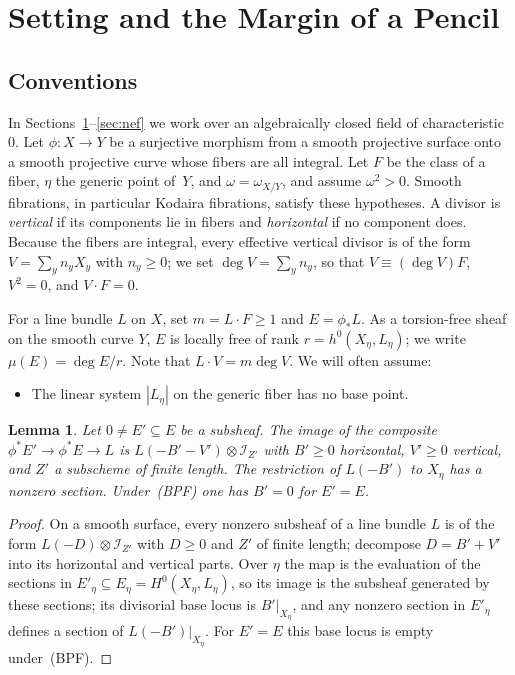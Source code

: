 \documentclass[11pt]{article}
\newtheorem{lemma}[theorem]{Lemma}
\theoremstyle{definition}
\theoremstyle{remark}
\newcommand{\cI}{\mathcal{I}}
\newcommand{\bpf}{\textup{(BPF)}}
\begin{document}
\section{Setting and the Margin of a Pencil}\label{sec:setting}

\subsection{Conventions}
In Sections~\ref{sec:setting}--\ref{sec:nef} we work over an algebraically closed
field of characteristic~$0$. Let $\phi\colon X\to Y$ be a surjective morphism
from a smooth projective surface onto a smooth projective curve whose fibers are
all integral. Let $F$ be the class of a fiber, $\eta$ the generic point of~$Y$,
and $\omega=\omega_{X/Y}$, and assume $\omega^2>0$. Smooth fibrations, in
particular Kodaira fibrations, satisfy these hypotheses. A divisor is
\emph{vertical} if its components lie in fibers and \emph{horizontal} if no
component does. Because the fibers are integral, every effective vertical divisor
is of the form $V=\sum_y n_yX_y$ with $n_y\ge 0$; we set $\deg V=\sum_y n_y$, so
that $V\equiv(\deg V)F$, $V^2=0$, and $V\cdot F=0$.

For a line bundle $L$ on $X$, set $m=L\cdot F\ge 1$ and $E=\phi_*L$. As a
torsion-free sheaf on the smooth curve $Y$, $E$ is locally free of rank
$r=h^0(X_\eta,L_\eta)$; we write $\mu(E)=\deg E/r$. Note that $L\cdot V=m\deg V$.
We will often assume:
\begin{itemize}[leftmargin=3.5em]
\item[\bpf] The linear system $|L_\eta|$ on the generic fiber has no base point.
\end{itemize}

\begin{lemma}\label{lem:image}
Let $0\ne E'\subseteq E$ be a subsheaf. The image of the composite
$\phi^*E'\to\phi^*E\to L$ is $L(-B'-V')\otimes\cI_{Z'}$ with $B'\ge 0$
horizontal, $V'\ge 0$ vertical, and $Z'$ a subscheme of finite length. The
restriction of $L(-B')$ to $X_\eta$ has a nonzero section. Under~\bpf{} one has
$B'=0$ for $E'=E$.
\end{lemma}

\begin{proof}
On a smooth surface, every nonzero subsheaf of a line bundle $L$ is of the form
$L(-D)\otimes\cI_{Z'}$ with $D\ge 0$ and $Z'$ of finite length; decompose
$D=B'+V'$ into its horizontal and vertical parts. Over $\eta$ the map is the
evaluation of the sections in $E'_\eta\subseteq E_\eta=H^0(X_\eta,L_\eta)$, so
its image is the subsheaf generated by these sections; its divisorial base locus
is $B'|_{X_\eta}$, and any nonzero section in $E'_\eta$ defines a section of
$L(-B')|_{X_\eta}$. For $E'=E$ this base locus is empty under~\bpf.
\end{proof}
\end{document}
